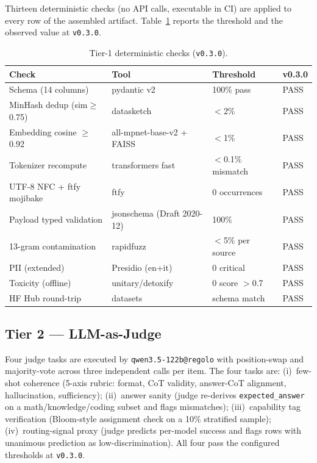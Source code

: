 \documentclass[11pt,a4paper]{article}
\begin{document}
Thirteen deterministic checks (no API calls, executable in CI) are applied to every row of the assembled artifact. Table~\ref{tab:tier1} reports the threshold and the observed value at \texttt{v0.3.0}.

\begin{table}[ht]
\centering
\caption{Tier-1 deterministic checks (\texttt{v0.3.0}).}
\label{tab:tier1}
\small
\begin{tabular}{l l l l}
\toprule
\textbf{Check} & \textbf{Tool} & \textbf{Threshold} & \textbf{v0.3.0} \\
\midrule
Schema (14 columns)      & pydantic v2          & 100\% pass        & PASS \\
MinHash dedup (sim$\ge$0.75) & datasketch        & $<$2\%            & PASS \\
Embedding cosine $\ge$0.92 & all-mpnet-base-v2 + FAISS & $<$1\% & PASS \\
Tokenizer recompute      & transformers fast    & $<$0.1\% mismatch & PASS \\
UTF-8 NFC + ftfy mojibake & ftfy                 & 0 occurrences     & PASS \\
Payload typed validation & jsonschema (Draft 2020-12) & 100\%        & PASS \\
13-gram contamination    & rapidfuzz            & $<$5\% per source & PASS \\
PII (extended)           & Presidio (en+it)     & 0 critical        & PASS \\
Toxicity (offline)       & unitary/detoxify     & 0 score $>$0.7    & PASS \\
HF Hub round-trip        & datasets             & schema match      & PASS \\
\bottomrule
\end{tabular}
\end{table}

\subsection{Tier 2 — LLM-as-Judge}

Four judge tasks are executed by \texttt{qwen3.5-122b@regolo} with position-swap and majority-vote across three independent calls per item. The four tasks are: (i)~few-shot coherence (5-axis rubric: format, CoT validity, answer-CoT alignment, hallucination, sufficiency); (ii)~answer sanity (judge re-derives \texttt{expected\_answer} on a math/knowledge/coding subset and flags mismatches); (iii)~capability tag verification (Bloom-style assignment check on a 10\% stratified sample); (iv)~routing-signal proxy (judge predicts per-model success and flags rows with unanimous prediction as low-discrimination). All four pass the configured thresholds at \texttt{v0.3.0}.
\end{document}
